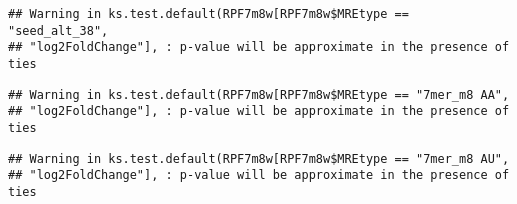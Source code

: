 \documentclass[
]{article}
\newenvironment{Shaded}{\begin{snugshade}}{\end{snugshade}}
\newcommand{\FunctionTok}[1]{\textcolor[rgb]{0.13,0.29,0.53}{\textbf{#1}}}
\newcommand{\NormalTok}[1]{#1}
\newcommand{\OtherTok}[1]{\textcolor[rgb]{0.56,0.35,0.01}{#1}}
\newcommand{\SpecialCharTok}[1]{\textcolor[rgb]{0.81,0.36,0.00}{\textbf{#1}}}
\newcommand{\StringTok}[1]{\textcolor[rgb]{0.31,0.60,0.02}{#1}}
\begin{document}
\begin{verbatim}
## Warning in ks.test.default(RPF7m8w[RPF7m8w$MREtype == "seed_alt_38",
## "log2FoldChange"], : p-value will be approximate in the presence of ties
\end{verbatim}

\begin{Shaded}
\end{Shaded}

\begin{verbatim}
## Warning in ks.test.default(RPF7m8w[RPF7m8w$MREtype == "7mer_m8 AA",
## "log2FoldChange"], : p-value will be approximate in the presence of ties
\end{verbatim}

\begin{Shaded}
\end{Shaded}

\begin{verbatim}
## Warning in ks.test.default(RPF7m8w[RPF7m8w$MREtype == "7mer_m8 AU",
## "log2FoldChange"], : p-value will be approximate in the presence of ties
\end{verbatim}
\end{document}
